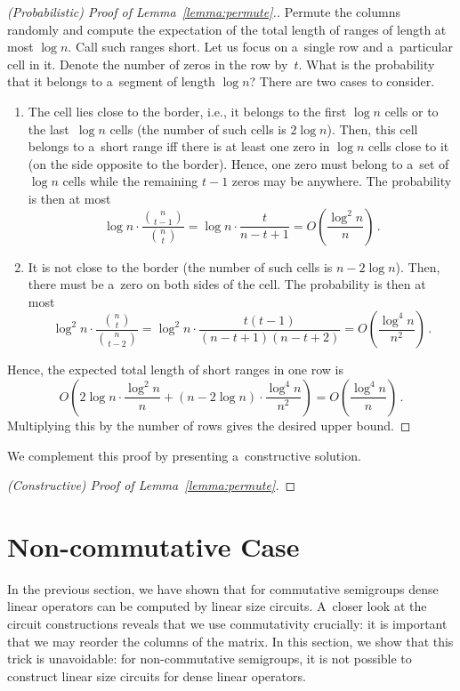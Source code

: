 \documentclass[11pt,letterpaper]{article}
\begin{document}
\begin{proof}[(Probabilistic) Proof of Lemma~\ref{lemma:permute}.]
Permute the columns randomly and compute the expectation of 
the total length of ranges of length at most $\log n$. Call such ranges short. Let us focus on a~single row and a~particular cell in it. Denote the number of zeros in the row by~$t$. What is the probability that it belongs to a~segment of length $\log n$? There are two cases to consider.
\begin{enumerate}
\item The cell lies close to the border, i.e., it belongs to 
the first $\log n$ cells or to the last~$\log n$ cells 
(the number of such cells is $2\log n$). Then, 
this cell belongs to a~short range iff there is at least one zero 
in $\log n$ cells close to it (on the side opposite to the border).
Hence, one zero must belong to a~set of $\log n$ cells while the remaining $t-1$ zeros may be anywhere. 
The probability is then at most
\[\log n \cdot \frac{\binom{n}{t-1}}{\binom{n}{t}}=\log n \cdot \frac{t}{n-t+1}=O\left(\frac{\log^2n}{n}\right) \, .\]
\item It is not close to the border (the number of such cells is $n-2\log n$). Then, there must be a~zero on both sides of the
cell. The probability is then at most
\[\log^2 n \cdot \frac{\binom{n}{t}}{\binom{n}{t-2}}=\log^2n \cdot \frac{t(t-1)}{(n-t+1)(n-t+2)}=O\left(\frac{\log^4 n}{n^2}\right) \, .\]
\end{enumerate}
Hence, the expected total length of short ranges in one row is
\[O\left( 2\log n \cdot \frac{\log^2 n}{n} + (n-2\log n) \cdot \frac{\log^4 n}{n^2}\right)=O\left(\frac{\log^4 n}{n}\right) \, .\]
Multiplying this by the number of rows gives the desired upper bound.
\end{proof}

We complement this proof by presenting a~constructive solution.

\begin{proof}[(Constructive) Proof of Lemma~\ref{lemma:permute}]

\end{proof}

\section{Non-commutative Case}

In the previous section, we have shown that for commutative semigroups dense linear operators can be computed by linear size circuits. A~closer look at the circuit constructions reveals that we use commutativity crucially: it is important that we may reorder the columns of the matrix. In this section, we show that this trick is unavoidable: for non-commutative semigroups, it is not possible to construct linear size circuits for dense linear operators. 
\end{document}
